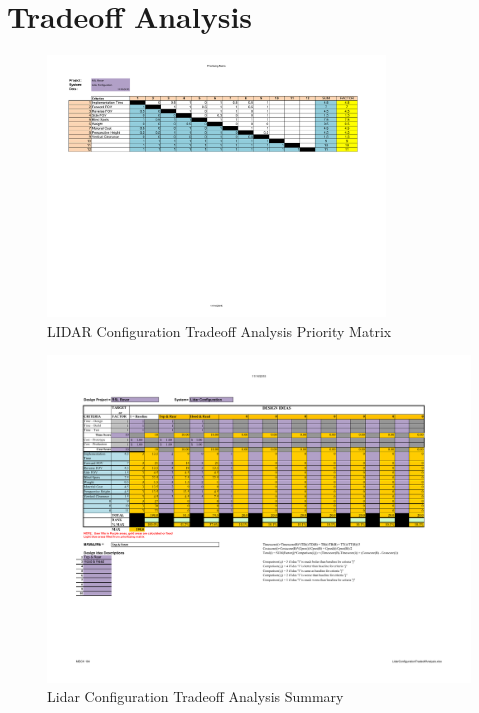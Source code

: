 \appendixpagenumbering
\chapter{Tradeoff Analysis} \label{App:tradeoff}

\begin{figure}[H]
\includegraphics[angle=90,width=0.8\textwidth]{TradeoffAnalysis/LIDAR1.pdf}
\caption[]{LIDAR Configuration Tradeoff Analysis Priority Matrix}
\label{fig:lidartradeoff1}
\end{figure}

\begin{figure}[H]
\includegraphics[angle=90,width=\textwidth]{TradeoffAnalysis/LIDAR2.pdf} 
\caption[]{Lidar Configuration Tradeoff Analysis Summary}
\label{fig:lidartradeoff}
\end{figure}

